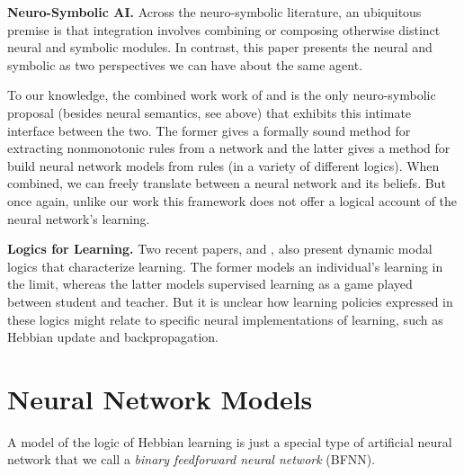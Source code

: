 \documentclass[12pt]{article}
\theoremstyle{definition}
\begin{document}
\textbf{Neuro-Symbolic AI.}
Across the neuro-symbolic literature, an ubiquitous premise is that integration involves combining or composing otherwise distinct neural and symbolic modules.  In contrast, this paper presents the neural and symbolic as two perspectives we can have about the same agent.

To our knowledge, the combined work work of \cite{garcez2001symbolic} and \cite{garcez2008neural} is the only neuro-symbolic proposal (besides neural semantics, see above) that exhibits this intimate interface between the two.  The former gives a formally sound method for extracting nonmonotonic rules from a network and the latter gives a method for build neural network models from rules (in a variety of different logics).  When combined, we can freely translate between a neural network and its beliefs.  But once again, unlike our work this framework does not offer a logical account of the neural network's learning.


\textbf{Logics for Learning.}
Two recent papers, \cite{baltag2019dynamic} and \cite{baltag2019right}, also present dynamic modal logics that characterize learning.  The former models an individual's learning in the limit, whereas the latter models supervised learning as a game played between student and teacher.  But it is unclear how learning policies expressed in these logics might relate to specific neural implementations of learning, such as Hebbian update and backpropagation. 

\section{\textcolor{myblue}{Neural Network Models}}

A model of the logic of Hebbian learning is just a special type of artificial neural network that we call a \emph{binary feedforward neural network} (BFNN).
\end{document}
